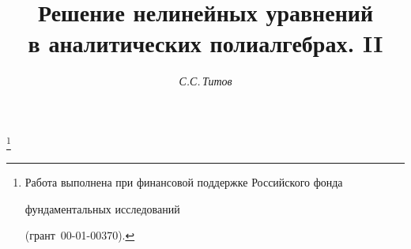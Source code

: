 




% 


\newcommand{\const}{\operatorname{const}}


\newcommand{\Pro}{\operatorname{Pr}}


\newcommand{\re}{\operatorname{Re}}


\newcommand{\diag}{\operatorname{diag}}


\newcommand{\ind}{\operatorname{ind}}


\newcommand{\up}[2]{\overset{#1}{#2}{}}


\newcommand{\tts}[1]{}


\renewcommand{\baselinestretch}{1.03}







\setcounter{page}{45}















\author{\it С.С.\,Титов}




\title{Решение нелинейных уравнений \\


в аналитических полиалгебрах. II}


\thanks{Работа выполнена при финансовой поддержке Российского фонда 


фундаментальных исследований 


(грант \No\,00-01-00370).} 








